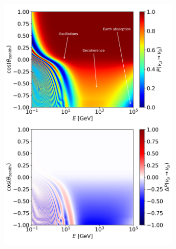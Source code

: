 \documentclass[a4paper,11pt]{article}
\begin{document}
\begin{figure}
    \begin{subfigure}[b]{0.5\textwidth}
    \centering
    \includegraphics[trim=0.0cm 12.7cm 0.cm 0.2cm, clip=true, width=1.\linewidth]{images/atmo_oscillogram_randomize_flavor_n0_matter.png}
    \caption{}
    \end{subfigure}
    \begin{subfigure}[b]{0.5\textwidth}
    \centering

\end{subfigure}
\end{figure}
\end{document}
